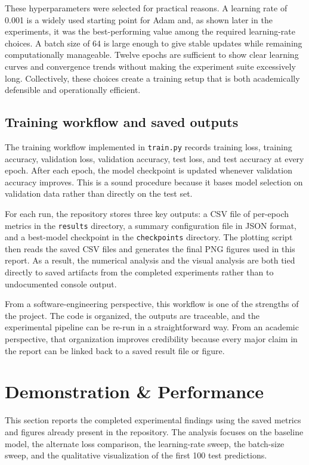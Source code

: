 \documentclass[conference]{IEEEtran}
\begin{document}
These hyperparameters were selected for practical reasons. A learning rate of 0.001 is a widely used starting point for Adam and, as shown later in the experiments, it was the best-performing value among the required learning-rate choices. A batch size of 64 is large enough to give stable updates while remaining computationally manageable. Twelve epochs are sufficient to show clear learning curves and convergence trends without making the experiment suite excessively long. Collectively, these choices create a training setup that is both academically defensible and operationally efficient.

\subsection{Training workflow and saved outputs}

The training workflow implemented in \texttt{train.py} records training loss, training accuracy, validation loss, validation accuracy, test loss, and test accuracy at every epoch. After each epoch, the model checkpoint is updated whenever validation accuracy improves. This is a sound procedure because it bases model selection on validation data rather than directly on the test set.

For each run, the repository stores three key outputs: a CSV file of per-epoch metrics in the \texttt{results} directory, a summary configuration file in JSON format, and a best-model checkpoint in the \texttt{checkpoints} directory. The plotting script then reads the saved CSV files and generates the final PNG figures used in this report. As a result, the numerical analysis and the visual analysis are both tied directly to saved artifacts from the completed experiments rather than to undocumented console output.

From a software-engineering perspective, this workflow is one of the strengths of the project. The code is organized, the outputs are traceable, and the experimental pipeline can be re-run in a straightforward way. From an academic perspective, that organization improves credibility because every major claim in the report can be linked back to a saved result file or figure.

\section{Demonstration \& Performance}

This section reports the completed experimental findings using the saved metrics and figures already present in the repository. The analysis focuses on the baseline model, the alternate loss comparison, the learning-rate sweep, the batch-size sweep, and the qualitative visualization of the first 100 test predictions.
\end{document}
